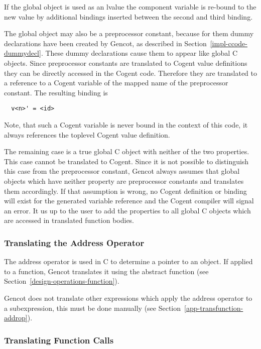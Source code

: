 If the global object is used as an lvalue the component variable  is re-bound to the new value by additional
bindings inserted between the second and third binding.

The global object may also be a preprocessor constant, because for them dummy declarations have been created by Gencot, as
described in Section~\ref{impl-ccode-dummydecl}. These dummy declarations cause them to appear like global C objects. Since
preprocessor constants are translated to Cogent value definitions they can be directly accessed in the Cogent code. Therefore
they are translated to a reference to a Cogent variable of the mapped name of the preprocessor constant. The resulting binding is
\begin{verbatim}
  v<n>' = <id>
\end{verbatim}
Note, that such
a Cogent variable is never bound in the context of this code, it always references the toplevel Cogent value definition.

The remaining case is a true global C object with neither of the two properties. This case cannot be translated to Cogent.
Since it is not possible to distinguish this case from the preprocessor constant, Gencot always assumes that global objects
which have neither property are preprocessor constants and translates them accordingly. If that assumption is wrong, no
Cogent definition or binding will exist for the generated variable reference and the Cogent compiler will signal an error.
It us up to the user to add the properties to all global C objects which are accessed in translated function bodies.

\subsubsection{Translating the Address Operator}

The address operator \code{\&} is used in C to determine a pointer to an object. If applied to a function, Gencot
translates it using the abstract function  (see Section~\ref{design-operations-function}).

Gencot does not translate other expressions which
apply the address operator to a subexpression, this must be done manually (see Section~\ref{app-transfunction-addrop}).

\subsubsection{Translating Function Calls}

